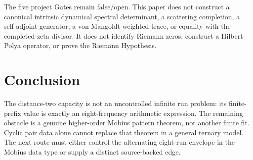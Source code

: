 \documentclass[11pt]{article}
\begin{document}
The five project Gates remain false/open.  This paper does not construct a
canonical intrinsic dynamical spectral determinant, a scattering completion,
a self-adjoint generator, a von-Mangoldt weighted trace, or equality with the
completed-zeta divisor.  It does not identify Riemann zeros, construct a
Hilbert--Polya operator, or prove the Riemann Hypothesis.

\section{Conclusion}

The distance-two capacity is not an uncontrolled infinite run problem: its
finite-prefix value is exactly an eight-frequency arithmetic expression.  The
remaining obstacle is a genuine higher-order Mobius pattern theorem, not
another finite fit.  Cyclic pair data alone cannot replace that theorem in a
general ternary model.  The next route must either control the alternating
eight-run envelope in the Mobius data type or supply a distinct source-backed
edge.



\end{document}

